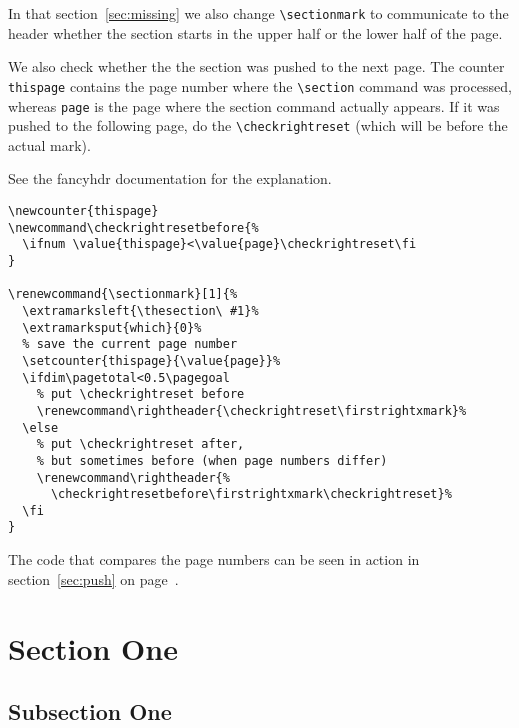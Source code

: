 \documentclass{article}
\renewcommand{\sectionmark}[1]{%
    \markboth{\thesection. #1}{}}
\begin{document}
\noindent
\begin{boxedminipage}{\textwidth}
In that section~\ref{sec:missing} we also change \verb|\sectionmark| to communicate to the header whether the section starts in the upper half or the lower half of the page.

We also check whether the the section was pushed to the next page.
The counter \texttt{thispage} contains the page number where the \verb|\section|
command was processed, whereas \texttt{page} is the page where the section
command actually appears. If it was pushed to the following page, do
the \verb|\checkrightreset| (which will be before the actual mark).

See the \textsf{fancyhdr} documentation for the explanation.

\begin{verbatim}
\newcounter{thispage}
\newcommand\checkrightresetbefore{% 
  \ifnum \value{thispage}<\value{page}\checkrightreset\fi
}

\renewcommand{\sectionmark}[1]{%
  \extramarksleft{\thesection\ #1}%
  \extramarksput{which}{0}%
  % save the current page number
  \setcounter{thispage}{\value{page}}%
  \ifdim\pagetotal<0.5\pagegoal
    % put \checkrightreset before
    \renewcommand\rightheader{\checkrightreset\firstrightxmark}%
  \else
    % put \checkrightreset after,
    % but sometimes before (when page numbers differ)
    \renewcommand\rightheader{%
      \checkrightresetbefore\firstrightxmark\checkrightreset}%
  \fi
}
\end{verbatim}

The code that compares the page numbers can be seen in action in section~\ref{sec:push} on page~\pageref{sec:push}.

\end{boxedminipage}

\newpage
\pagestyle{fancy}

\section{Section One}

\subsection{Subsection One}

 \lipsum[1-2]
\end{document}
